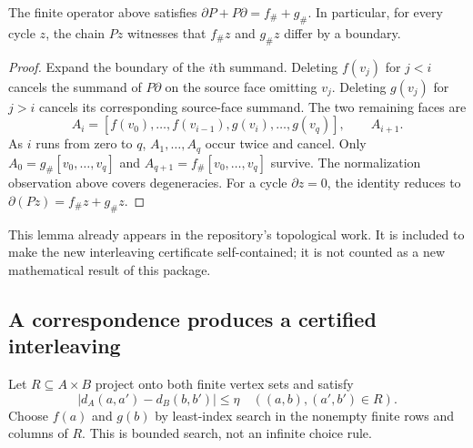 \begin{lemma}
\label{ct:prism}
The finite operator above satisfies
$\partial P+P\partial=f_\#+g_\#$.
In particular, for every cycle $z$, the chain $Pz$ witnesses that
$f_\#z$ and $g_\#z$ differ by a boundary.
\end{lemma}
\begin{proof}
Expand the boundary of the $i$th summand. Deleting $f(v_j)$ for $j<i$
cancels the summand of $P\partial$ on the source face omitting $v_j$.
Deleting $g(v_j)$ for $j>i$ cancels its corresponding source-face summand.
The two remaining faces are
\[
 A_i=[f(v_0),\ldots,f(v_{i-1}),g(v_i),\ldots,g(v_q)],
 \qquad A_{i+1}.
\]
As $i$ runs from zero to $q$, $A_1,\ldots,A_q$ occur twice and cancel.
Only $A_0=g_\#[v_0,\ldots,v_q]$ and
$A_{q+1}=f_\#[v_0,\ldots,v_q]$ survive. The normalization observation
above covers degeneracies. For a cycle $\partial z=0$, the identity reduces
to $\partial(Pz)=f_\#z+g_\#z$.\end{proof}

This lemma already appears in the repository's topological work. It is
included to make the new interleaving certificate self-contained; it is
not counted as a new mathematical result of this package.

\subsection{A correspondence produces a certified interleaving}

Let $R\subseteq A\times B$ project onto both finite vertex sets and satisfy
\[
 |d_A(a,a')-d_B(b,b')|\leq\eta
       \quad((a,b),(a',b')\in R).
 \label{ct:distortion}
\]
Choose $f(a)$ and $g(b)$ by least-index search in the nonempty finite rows
and columns of $R$. This is bounded search, not an infinite choice rule.

